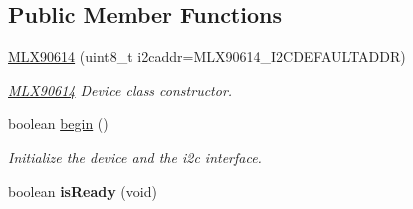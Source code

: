\subsection*{Public Member Functions}
\begin{DoxyCompactItemize}
\item 
\hyperlink{class_m_l_x90614_abd5039fd7e21e82db9f0cf2575f0d23a}{M\-L\-X90614} (uint8\-\_\-t i2caddr=M\-L\-X90614\-\_\-\-I2\-C\-D\-E\-F\-A\-U\-L\-T\-A\-D\-D\-R)
\begin{DoxyCompactList}\small\item\em \hyperlink{class_m_l_x90614}{M\-L\-X90614} Device class constructor. \end{DoxyCompactList}\item 
\hypertarget{class_m_l_x90614_ade3c27bfa8ff06c043e2c83743e38b5c}{boolean \hyperlink{class_m_l_x90614_ade3c27bfa8ff06c043e2c83743e38b5c}{begin} ()}\label{class_m_l_x90614_ade3c27bfa8ff06c043e2c83743e38b5c}

\begin{DoxyCompactList}\small\item\em Initialize the device and the i2c interface. \end{DoxyCompactList}\item 
\hypertarget{class_m_l_x90614_a3fa540d984b00a7c062be1b3e84bd881}{boolean {\bfseries is\-Ready} (void)}\label{class_m_l_x90614_a3fa540d984b00a7c062be1b3e84bd881}


\end{DoxyCompactItemize}
